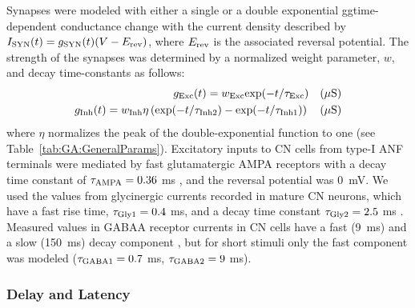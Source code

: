 Synapses were modeled with either a single or a double exponential
ggtime-dependent conductance change with the current density described
by $I_{{\rm SYN}} (t)=g_{{\rm SYN}} (t)(V-E_{{\rm rev}} )$, where
$E_{\rm rev}$ is the associated reversal potential. The strength of
the synapses was determined by a normalized weight parameter, $w$, and
decay time-constants as follows:
\begin{eqnarray}
  \label{eq:GA:11}
  g_{{\rm Exc}} (t)=w_{{\rm Exc}} {\rm exp}(-t/\tau _{{\rm Exc}} ) \quad (\mu\mathrm{S}) \\
  \label{eq:GA:12} g_{{\rm Inh}} (t)=w_{{\rm Inh}} \eta \left({\rm exp}(-t/\tau_{{\rm Inh2}} )-{\rm exp}(-t/\tau _{{\rm Inh1}} )\right) \quad (\mu\mathrm{S}) 
\end{eqnarray}
\noindent where $\eta$ normalizes the peak of the double-exponential
function to one (see Table~\ref{tab:GA:GeneralParams}). Excitatory
inputs to CN cells from type-I ANF terminals were mediated by fast
glutamatergic AMPA receptors with a decay time constant of $\tau
_{{\rm AMPA}} = 0.36$ ms
\citep{Gardner:2000,GardnerTrussellEtAl:1999}, and the reversal
potential was 0~mV. We used the values from glycinergic currents
recorded in mature CN neurons, which have a fast rise time, $\tau_{{\rm Gly1}} = 0.4$ ms, and a decay time constant $\tau_{{\rm Gly2}}
= 2.5$ ms
\citep{AwatramaniTurecekEtAl:2005,HartyManis:1998,LeaoOleskevichEtAl:2004,LimOleskevichEtAl:2003}.
Measured values in GABAA receptor currents in CN cells have a fast
(9~ms) and a slow (150~ms) decay component
\citep{AwatramaniTurecekEtAl:2005,DavisYoung:2000}, but for short
stimuli only the fast component was modeled ($\tau_{{\rm GABA1}}
=0.7$ ms, $\tau_{{\rm GABA2}} =9$ ms).

\subsubsection{Delay and Latency}

